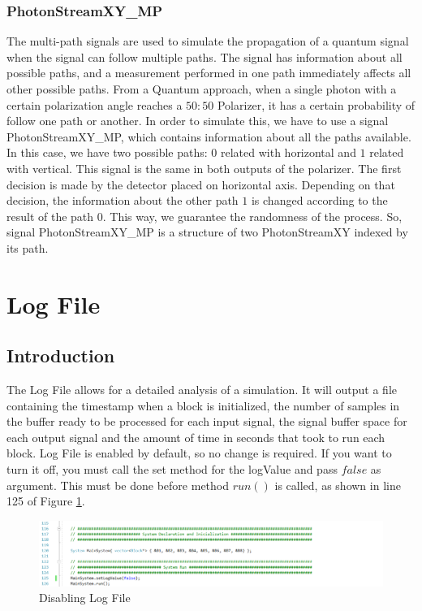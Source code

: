 \begin{refsection}
\subsubsection{PhotonStreamXY\_MP}
The multi-path signals are used to simulate the propagation of a quantum signal when the signal can follow multiple paths. The signal has information about all possible paths, and a measurement performed in one path immediately affects all other possible paths.
From a Quantum approach, when a single photon with a certain polarization angle reaches a $50:50$ Polarizer, it has a certain probability of follow one path or another. In order to simulate this, we have to use a signal PhotonStreamXY\_MP, which contains information about all the paths available. In this case, we have two possible paths: $0$ related with horizontal and $1$ related with vertical. This signal is the same in both outputs of the polarizer. The first decision is made by the detector placed on horizontal axis. Depending on that decision, the information about the other path $1$ is changed according to the result of the path $0$. This way, we guarantee the randomness of the process. So, signal PhotonStreamXY\_MP is a structure of two PhotonStreamXY indexed by its path.


\section{Log File}
\subsection{Introduction}
The Log File allows for a detailed analysis of a simulation. It will output a file containing the timestamp when a block is initialized, the number of samples in the buffer ready to be processed for each input signal, the signal buffer space for each output signal and the amount of time in seconds that took to run each block. Log File is enabled by default, so no change is required. If you want to turn it off, you must call the set method for the logValue and pass $false$ as argument. This must be done before method $run()$ is called, as shown in line 125 of Figure \ref{fig:logfileexample}.

\renewcommand{\figurename}{Figure}
\begin{figure}[H]
\centering
\includegraphics[width=1.3\linewidth]{./chapter/simulator_structure/figures/log_file_example}
\caption{Disabling Log File}
\label{fig:logfileexample}
\end{figure}


\end{refsection}
